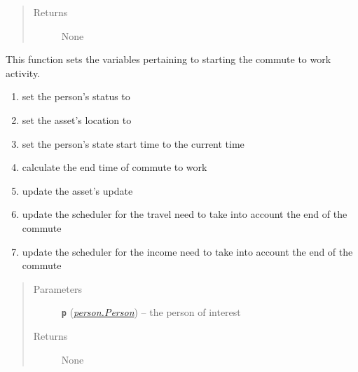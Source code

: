 \documentclass[letterpaper,10pt,english]{sphinxmanual}
\begin{document}
\begin{fulllineitems}
\begin{fulllineitems}
\begin{quote}
\begin{description}
\item[{Returns}] \leavevmode
None

\end{description}\end{quote}

\end{fulllineitems}


\begin{fulllineitems}
\label{commute:commute.Commute_To_Work.start_commute}
This function sets the variables pertaining to starting the commute to work activity.
\begin{enumerate}
\item {} 
set the person's status to 

\item {} 
set the asset's location to 

\item {} 
set the person's state start time to the current time

\item {} 
calculate the end time of commute to work

\item {} 
update the asset's update

\item {} 
update the scheduler for the travel need to take into account the end of the commute

\item {} 
update the scheduler for the income need to take into account the end of the commute

\end{enumerate}
\begin{quote}\begin{description}
\item[{Parameters}] \leavevmode
\textbf{\texttt{p}} ({\hyperref[person:person.Person]{\emph{\emph{person.Person}}}}) -- the person of interest

\item[{Returns}] \leavevmode
None

\end{description}\end{quote}

\end{fulllineitems}


\end{fulllineitems}
\end{document}
